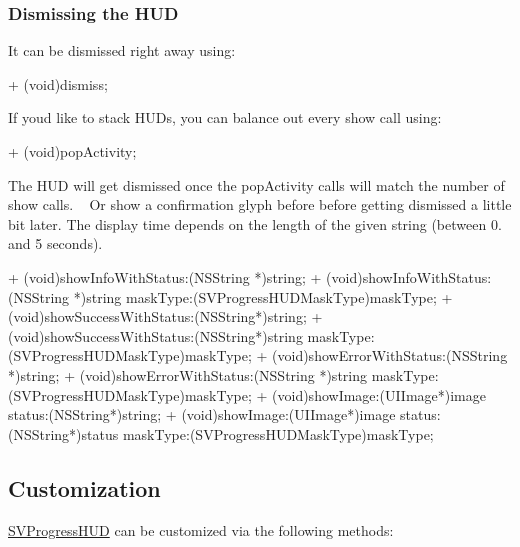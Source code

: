 \subsubsection*{Dismissing the H\+UD}

It can be dismissed right away using\+:


\begin{DoxyCode}
+ (void)dismiss;
\end{DoxyCode}


If you\textquotesingle{}d like to stack H\+U\+Ds, you can balance out every show call using\+:


\begin{DoxyCode}
+ (void)popActivity;
\end{DoxyCode}


The H\+UD will get dismissed once the {\ttfamily pop\+Activity} calls will match the number of show calls. ~\newline
 Or show a confirmation glyph before before getting dismissed a little bit later. The display time depends on the length of the given string (between 0. and 5 seconds).


\begin{DoxyCode}
+ (void)showInfoWithStatus:(NSString *)string;
+ (void)showInfoWithStatus:(NSString *)string maskType:(SVProgressHUDMaskType)maskType;
+ (void)showSuccessWithStatus:(NSString*)string;
+ (void)showSuccessWithStatus:(NSString*)string maskType:(SVProgressHUDMaskType)maskType;
+ (void)showErrorWithStatus:(NSString *)string;
+ (void)showErrorWithStatus:(NSString *)string maskType:(SVProgressHUDMaskType)maskType;
+ (void)showImage:(UIImage*)image status:(NSString*)string;
+ (void)showImage:(UIImage*)image status:(NSString*)status maskType:(SVProgressHUDMaskType)maskType;
\end{DoxyCode}


\subsection*{Customization}

{\ttfamily \mbox{\hyperlink{interface_s_v_progress_h_u_d}{S\+V\+Progress\+H\+UD}}} can be customized via the following methods\+:


